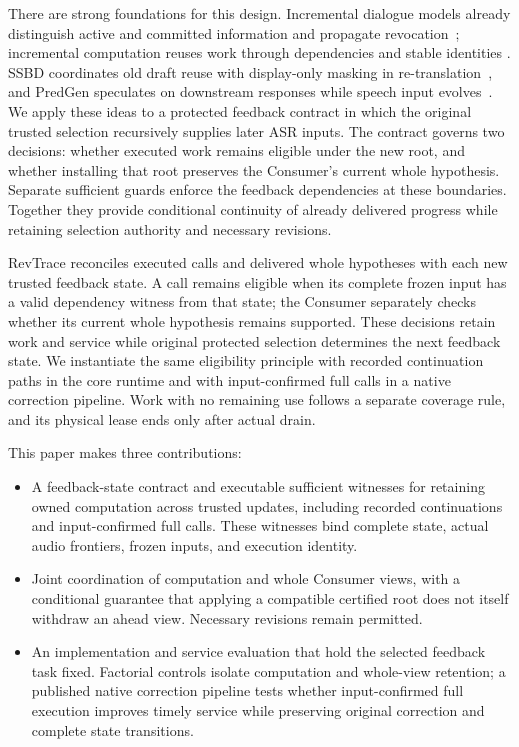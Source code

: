 There are strong foundations for this design. Incremental dialogue models
already distinguish active and committed information and propagate
revocation~\cite{schlangen2011incremental}; incremental computation reuses
work through dependencies and stable identities
\cite{hammer2014adapton,hammer2015names,mcsherry2013differential}.
SSBD coordinates old draft reuse with display-only masking in
re-translation~\cite{zeng2026ssbd}, and PredGen speculates on downstream
responses while speech input evolves~\cite{li2025predgen}. We apply these
ideas to a protected feedback contract in which the original trusted
selection recursively supplies later ASR inputs. The contract governs two
decisions: whether executed work remains eligible under the new root, and
whether installing that root preserves the Consumer's current whole
hypothesis. Separate sufficient guards enforce the feedback dependencies
at these boundaries. Together they provide conditional continuity of
already delivered progress while retaining selection authority and
necessary revisions.

RevTrace reconciles executed calls and delivered whole hypotheses with each
new trusted feedback state. A call remains eligible when its complete frozen
input has a valid dependency witness from that state; the Consumer separately
checks whether its current whole hypothesis remains supported. These
decisions retain work and service while original protected selection
determines the next feedback state. We instantiate the same eligibility
principle with recorded continuation paths in the core runtime and with
input-confirmed full calls in a native correction pipeline. Work with no
remaining use follows a separate coverage rule, and its physical lease ends
only after actual drain.

This paper makes three contributions:
\begin{itemize}
\item A feedback-state contract and executable sufficient witnesses for
  retaining owned computation across trusted updates, including recorded
  continuations and input-confirmed full calls. These witnesses bind
  complete state, actual audio frontiers, frozen inputs, and execution
  identity.
\item Joint coordination of computation and whole Consumer views, with a
  conditional guarantee that applying a compatible certified root does not
  itself withdraw an ahead view. Necessary revisions remain permitted.
\item An implementation and service evaluation that hold the selected
  feedback task fixed. Factorial controls isolate computation and whole-view
  retention; a published native correction pipeline tests whether
  input-confirmed full execution improves timely service while preserving
  original correction and complete state transitions.
\end{itemize}

